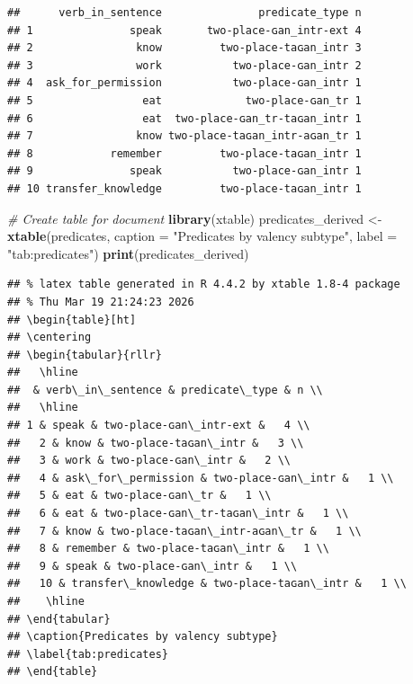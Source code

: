 \documentclass[
]{article}
\newenvironment{Shaded}{\begin{snugshade}}{\end{snugshade}}
\newcommand{\AttributeTok}[1]{\textcolor[rgb]{0.13,0.29,0.53}{#1}}
\newcommand{\CommentTok}[1]{\textcolor[rgb]{0.56,0.35,0.01}{\textit{#1}}}
\newcommand{\FunctionTok}[1]{\textcolor[rgb]{0.13,0.29,0.53}{\textbf{#1}}}
\newcommand{\NormalTok}[1]{#1}
\newcommand{\OtherTok}[1]{\textcolor[rgb]{0.56,0.35,0.01}{#1}}
\newcommand{\StringTok}[1]{\textcolor[rgb]{0.31,0.60,0.02}{#1}}
\begin{document}
\begin{verbatim}
##      verb_in_sentence               predicate_type n
## 1               speak       two-place-ɢan_intr-ext 4
## 2                know         two-place-taɢan_intr 3
## 3                work           two-place-ɢan_intr 2
## 4  ask_for_permission           two-place-ɢan_intr 1
## 5                 eat             two-place-ɢan_tr 1
## 6                 eat  two-place-ɢan_tr-taɢan_intr 1
## 7                know two-place-taɢan_intr-aɢan_tr 1
## 8            remember         two-place-taɢan_intr 1
## 9               speak           two-place-ɢan_intr 1
## 10 transfer_knowledge         two-place-taɢan_intr 1
\end{verbatim}

\begin{Shaded}
\begin{Highlighting}[]
 \CommentTok{\# Create table for document}
\FunctionTok{library}\NormalTok{(xtable) }
\NormalTok{predicates\_derived }\OtherTok{\textless{}{-}} \FunctionTok{xtable}\NormalTok{(predicates,}
             \AttributeTok{caption =} \StringTok{"Predicates by valency subtype"}\NormalTok{,}
             \AttributeTok{label   =} \StringTok{"tab:predicates"}\NormalTok{)}
\FunctionTok{print}\NormalTok{(predicates\_derived)}
\end{Highlighting}
\end{Shaded}

\begin{verbatim}
## % latex table generated in R 4.4.2 by xtable 1.8-4 package
## % Thu Mar 19 21:24:23 2026
## \begin{table}[ht]
## \centering
## \begin{tabular}{rllr}
##   \hline
##  & verb\_in\_sentence & predicate\_type & n \\ 
##   \hline
## 1 & speak & two-place-ɢan\_intr-ext &   4 \\ 
##   2 & know & two-place-taɢan\_intr &   3 \\ 
##   3 & work & two-place-ɢan\_intr &   2 \\ 
##   4 & ask\_for\_permission & two-place-ɢan\_intr &   1 \\ 
##   5 & eat & two-place-ɢan\_tr &   1 \\ 
##   6 & eat & two-place-ɢan\_tr-taɢan\_intr &   1 \\ 
##   7 & know & two-place-taɢan\_intr-aɢan\_tr &   1 \\ 
##   8 & remember & two-place-taɢan\_intr &   1 \\ 
##   9 & speak & two-place-ɢan\_intr &   1 \\ 
##   10 & transfer\_knowledge & two-place-taɢan\_intr &   1 \\ 
##    \hline
## \end{tabular}
## \caption{Predicates by valency subtype} 
## \label{tab:predicates}
## \end{table}
\end{verbatim}
\end{document}

